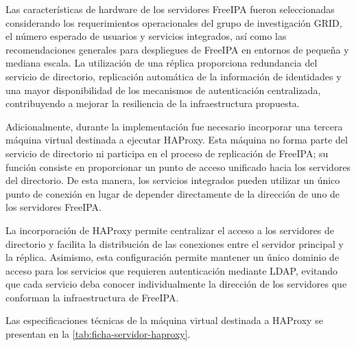 


Las características de hardware de los servidores FreeIPA fueron seleccionadas considerando los requerimientos operacionales del grupo de investigación \ac{GRID}, el número esperado de usuarios y servicios integrados, así como las recomendaciones generales para despliegues de FreeIPA en entornos de pequeña y mediana escala. La utilización de una réplica proporciona redundancia del servicio de directorio, replicación automática de la información de identidades y una mayor disponibilidad de los mecanismos de autenticación centralizada, contribuyendo a mejorar la resiliencia de la infraestructura propuesta.

Adicionalmente, durante la implementación fue necesario incorporar una tercera máquina virtual destinada a ejecutar HAProxy. Esta máquina no forma parte del servicio de directorio ni participa en el proceso de replicación de FreeIPA; su función consiste en proporcionar un punto de acceso unificado hacia los servidores del directorio. De esta manera, los servicios integrados pueden utilizar un único punto de conexión en lugar de depender directamente de la dirección de uno de los servidores FreeIPA.

La incorporación de HAProxy permite centralizar el acceso a los servidores de directorio y facilita la distribución de las conexiones entre el servidor principal y la réplica. Asimismo, esta configuración permite mantener un único dominio de acceso para los servicios que requieren autenticación mediante \ac{LDAP}, evitando que cada servicio deba conocer individualmente la dirección de los servidores que conforman la infraestructura de FreeIPA.

Las especificaciones técnicas de la máquina virtual destinada a HAProxy se presentan en la \autoref{tab:ficha-servidor-haproxy}.


